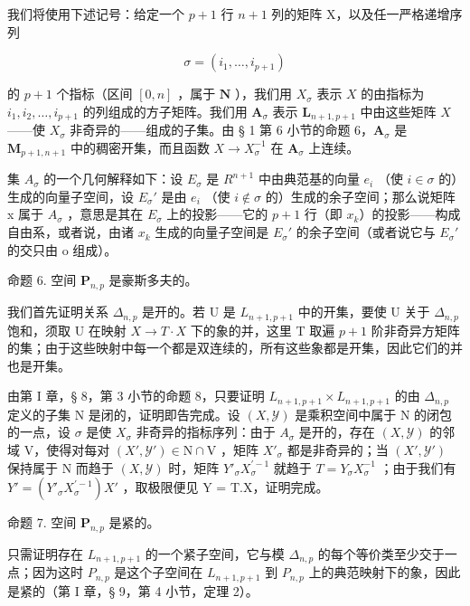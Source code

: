 我们将使用下述记号：给定一个 \(p + 1\) 行 \(n + 1\) 列的矩阵 X，以及任一严格递增序列

\[
\sigma = (i _ {1}, \dots , i _ {p + 1})
\]

的 \(p + 1\) 个指标（区间 \([0, n]\) ，属于 \(\mathbf{N}\) ），我们用 \(X_{\sigma}\) 表示 \(X\) 的由指标为 \(i_1, i_2, \ldots, i_{p+1}\) 的列组成的方子矩阵。我们用 \(\mathbf{A}_{\sigma}\) 表示 \(\mathbf{L}_{n+1, p+1}\) 中由这些矩阵 \(X\) ——使 \(X_{\sigma}\) 非奇异的——组成的子集。由 § 1 第 6 小节的命题 6，\(\mathbf{A}_{\sigma}\) 是 \(\mathbf{M}_{p+1, n+1}\) 中的稠密开集，而且函数 \(X \to X_{\sigma}^{-1}\) 在 \(\mathbf{A}_{\sigma}\) 上连续。

集 \(A_{\sigma}\) 的一个几何解释如下：设 \(E_{\sigma}\) 是 \(R^{n+1}\) 中由典范基的向量 \(e_{i}\) （使 \(i \in \sigma\) 的）生成的向量子空间，设 \(E_{\sigma}'\) 是由 \(e_{i}\) （使 \(i \notin \sigma\) 的）生成的余子空间；那么说矩阵 x 属于 \(A_{\sigma}\) ，意思是其在 \(E_{\sigma}\) 上的投影——它的 \(p + 1\) 行（即 \(x_{k}\)）的投影——构成自由系，或者说，由诸 \(x_{k}\) 生成的向量子空间是 \(E_{\sigma}'\) 的余子空间（或者说它与 \(E_{\sigma}'\) 的交只由 o 组成）。

命题 6. 空间 \(\mathbf{P}_{n,p}\) 是豪斯多夫的。

我们首先证明关系 \(\Delta_{n,p}\) 是开的。若 U 是 \(L_{n+1,p+1}\) 中的开集，要使 U 关于 \(\Delta_{n,p}\) 饱和，须取 U 在映射 \(X \to T \cdot X\) 下的象的并，这里 T 取遍 \(p + 1\) 阶非奇异方矩阵的集；由于这些映射中每一个都是双连续的，所有这些象都是开集，因此它们的并也是开集。

由第 I 章，§ 8，第 3 小节的命题 8，只要证明 \(L_{n+1,p+1} \times L_{n+1,p+1}\) 的由 \(\Delta_{n,p}\) 定义的子集 N 是闭的，证明即告完成。设 \((X,\mathcal{Y})\) 是乘积空间中属于 N 的闭包的一点，设 \(\sigma\) 是使 \(X_{\sigma}\) 非奇异的指标序列：由于 \(A_{\sigma}\) 是开的，存在 \((X,\mathcal{Y})\) 的邻域 V，使得对每对 \((X',\mathcal{Y}') \in \mathrm{N} \cap \mathrm{V}\) ，矩阵 \(X'_{\sigma}\) 都是非奇异的；当 \((X',\mathcal{Y}')\) 保持属于 N 而趋于 \((X,\mathcal{Y})\) 时，矩阵 \(Y'_{\sigma}X_{\sigma}^{\prime -1}\) 就趋于 \(T = Y_{\sigma}X_{\sigma}^{-1}\) ；由于我们有 \(Y' = (Y'_{\sigma}X_{\sigma}^{\prime -1})X'\) ，取极限便见 Y = T.X，证明完成。

命题 7. 空间 \(\mathbf{P}_{n,p}\) 是紧的。

只需证明存在 \(L_{n+1, p+1}\) 的一个紧子空间，它与模 \(\Delta_{n,p}\) 的每个等价类至少交于一点；因为这时 \(P_{n,p}\) 是这个子空间在 \(L_{n+1, p+1}\) 到 \(P_{n,p}\) 上的典范映射下的象，因此是紧的（第 I 章，§ 9，第 4 小节，定理 2）。

